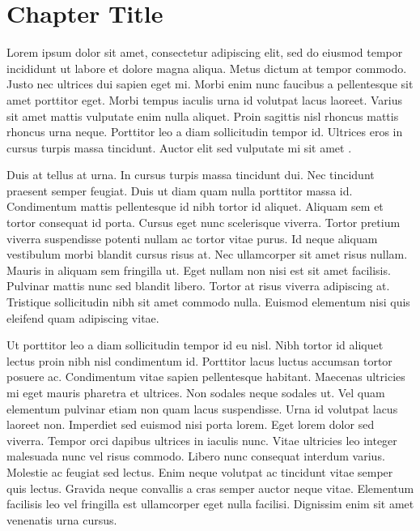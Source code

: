 \chapter{Chapter Title}
Lorem ipsum dolor sit amet, consectetur adipiscing elit, sed do eiusmod tempor incididunt ut labore et dolore magna aliqua. Metus dictum at tempor commodo. Justo nec ultrices dui sapien eget mi. Morbi enim nunc faucibus a pellentesque sit amet porttitor eget. Morbi tempus iaculis urna id volutpat lacus laoreet. Varius sit amet mattis vulputate enim nulla aliquet. Proin sagittis nisl rhoncus mattis rhoncus urna neque. Porttitor leo a diam sollicitudin tempor id. Ultrices eros in cursus turpis massa tincidunt. Auctor elit sed vulputate mi sit amet \cite{sample2023demo}.

Duis at tellus at urna. In cursus turpis massa tincidunt dui. Nec tincidunt praesent semper feugiat. Duis ut diam quam nulla porttitor massa id. Condimentum mattis pellentesque id nibh tortor id aliquet. Aliquam sem et tortor consequat id porta. Cursus eget nunc scelerisque viverra. Tortor pretium viverra suspendisse potenti nullam ac tortor vitae purus. Id neque aliquam vestibulum morbi blandit cursus risus at. Nec ullamcorper sit amet risus nullam. Mauris in aliquam sem fringilla ut. Eget nullam non nisi est sit amet facilisis. Pulvinar mattis nunc sed blandit libero. Tortor at risus viverra adipiscing at. Tristique sollicitudin nibh sit amet commodo nulla. Euismod elementum nisi quis eleifend quam adipiscing vitae.

Ut porttitor leo a diam sollicitudin tempor id eu nisl. Nibh tortor id aliquet lectus proin nibh nisl condimentum id. Porttitor lacus luctus accumsan tortor posuere ac. Condimentum vitae sapien pellentesque habitant. Maecenas ultricies mi eget mauris pharetra et ultrices. Non sodales neque sodales ut. Vel quam elementum pulvinar etiam non quam lacus suspendisse. Urna id volutpat lacus laoreet non. Imperdiet sed euismod nisi porta lorem. Eget lorem dolor sed viverra. Tempor orci dapibus ultrices in iaculis nunc. Vitae ultricies leo integer malesuada nunc vel risus commodo. Libero nunc consequat interdum varius. Molestie ac feugiat sed lectus. Enim neque volutpat ac tincidunt vitae semper quis lectus. Gravida neque convallis a cras semper auctor neque vitae. Elementum facilisis leo vel fringilla est ullamcorper eget nulla facilisi. Dignissim enim sit amet venenatis urna cursus.

